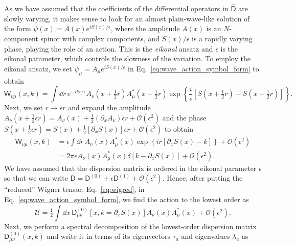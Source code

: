 As we have assumed that the coefficients of the differential operators in $\widehat{\mathsf{D}}$ are slowly varying, it makes sense to look for an almost plain-wave-like solution of the form
$\psi(x) = A(x)e^{iS(x)/\epsilon}$, where the amplitude $A(x)$ is an $N$-component spinor with complex components, and $S(x)/\epsilon$ is a rapidly varying phase, playing the role of an action.
This is the \emph{eikonal} ansatz and $\epsilon$ is the eikonal parameter, which controls the slowness of the variation.
To employ the eikonal ansatz, we set $\psi_{\mu} = A_{\mu}e^{iS(x)/\epsilon}$ in Eq.~\eqref{eq:wave_action_symbol_form} to obtain%
%
\begin{equation}
    \mathsf{W}_{\nu\mu}(x, k) = \int \dd{r}\,e^{-ikr/\epsilon} A_{\nu}\left(x + \tfrac{1}{2} r\right)A_{\mu}^{*}\left(x - \tfrac{1}{2} r\right)\exp\left\{\frac{i}{\epsilon}\left[S\left(x + \tfrac{1}{2} r\right) - S\left(x - \tfrac{1}{2} r\right)\right]\right\}.
\end{equation}
%
Next, we set $r \to \epsilon r$ and expand the amplitude $A_{\nu}(x + \tfrac{1}{2}\epsilon r) = A_{\nu}(x) + \tfrac{1}{2}(\partial_{x}A_{\nu})\epsilon r + \mathcal{O}(\epsilon^{2})$ and the phase $S(x + \tfrac{1}{2}\epsilon r) = S(x) + \tfrac{1}{2}[\partial_{x}S(x)]\epsilon r + \mathcal{O}(\epsilon^{2})$ to obtain
%
\begin{equation}
  \begin{aligned}
    \mathsf{W}_{\nu\mu}(x, k) &= \epsilon\int \dd{r}\,A_{\nu}(x)A_{\mu}^{*}(x)\exp\left\{ir\left[\partial_{x}S(x) - k\right]\right\} + \mathcal{O}(\epsilon^{2}) \\
                        &= 2\pi\epsilon A_{\nu}(x)A^{*}_{\mu}(x)\delta\left[k - \partial_{x}S(x)\right] + \mathcal{O}(\epsilon^{2}).
  \end{aligned}
  \label{eq:wigred}
\end{equation}
%
We have assumed that the dispersion matrix is ordered in the eikonal parameter $\epsilon$ so that we can write
$\mathsf{D} = \mathsf{D}^{(0)} + \epsilon \mathsf{D}^{(1)} + \mathcal{O}(\epsilon^{2})$.
Hence, after putting the ``reduced'' Wigner tensor, Eq.~\eqref{eq:wigred}, in Eq.~\eqref{eq:wave_action_symbol_form}, we find the action to the lowest order as
%
\begin{equation}
  \mathscr{U} = \tfrac{1}{2}\int \dd{x}\, \mathsf{D}^{(0)}_{\mu\nu}\left[x, k=\partial_{x}S(x)\right]A_{\nu}(x)A^{*}_{\mu}(x) + \mathcal{O}(\epsilon^{2}).
  \label{eq:wave_action_reduced_1}
\end{equation}
%
Next, we perform a spectral decomposition of the lowest-order dispersion matrix $\mathsf{D}^{(0)}_{\mu\nu}(x, k)$ and write it in terms of its eigenvectors $\tau_{a}$ and eigenvalues $\lambda_{a}$ as%
